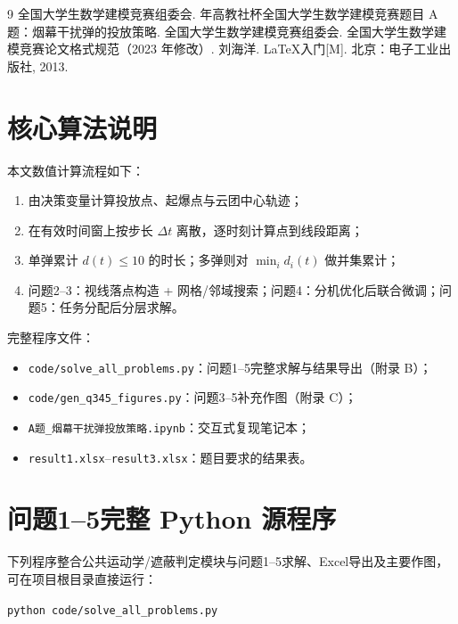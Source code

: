 \documentclass[withoutpreface,bwprint]{cumcmthesis}
\begin{document}
\begin{thebibliography}{9}
全国大学生数学建模竞赛组委会.
 年高教社杯全国大学生数学建模竞赛题目 A 题：烟幕干扰弹的投放策略.
全国大学生数学建模竞赛组委会.
\newblock 全国大学生数学建模竞赛论文格式规范（2023 年修改）.
刘海洋.
\newblock \LaTeX{}入门[M].
\newblock 北京：电子工业出版社, 2013.
\end{thebibliography}

\newpage
\begin{appendices}
\section{核心算法说明}
本文数值计算流程如下：
\begin{enumerate}
  \item 由决策变量计算投放点、起爆点与云团中心轨迹；
  \item 在有效时间窗上按步长 $\Delta t$ 离散，逐时刻计算点到线段距离；
  \item 单弹累计 $d(t)\le 10$ 的时长；多弹则对 $\min_i d_i(t)$ 做并集累计；
  \item 问题2--3：视线落点构造 + 网格/邻域搜索；问题4：分机优化后联合微调；问题5：任务分配后分层求解。
\end{enumerate}
完整程序文件：
\begin{itemize}
  \item \texttt{code/solve\_all\_problems.py}：问题1--5完整求解与结果导出（附录 B）；
  \item \texttt{code/gen\_q345\_figures.py}：问题3--5补充作图（附录 C）；
  \item \texttt{A题\_烟幕干扰弹投放策略.ipynb}：交互式复现笔记本；
  \item \texttt{result1.xlsx}--\texttt{result3.xlsx}：题目要求的结果表。
\end{itemize}


\section{问题1--5完整 Python 源程序}
\label{app:code-all}
下列程序整合公共运动学/遮蔽判定模块与问题1--5求解、Excel导出及主要作图，可在项目根目录直接运行：
\begin{center}
\texttt{python code/solve\_all\_problems.py}
\end{center}


\end{appendices}
\end{document}
